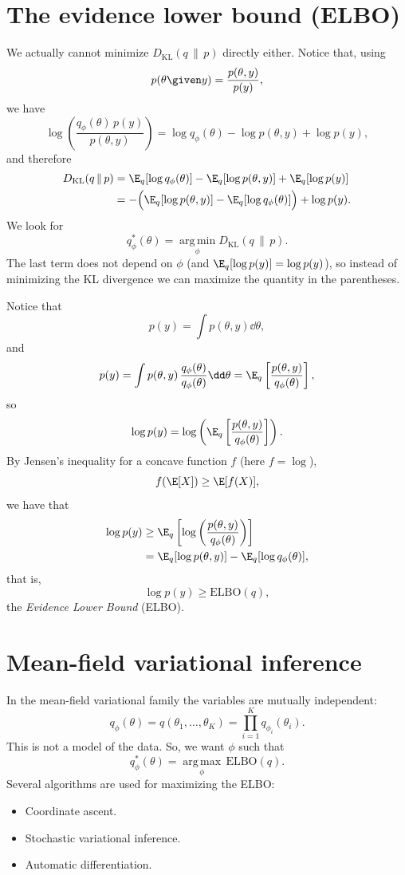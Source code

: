 \section{The evidence lower bound (ELBO)}
We actually cannot minimize $D_{\mathrm{KL}}(q \,\|\, p)$ directly either. Notice that, using
\[
p(\theta \given y) = \frac{p(\theta, y)}{p(y)},
\]
we have
\[
\log\left(\frac{q_\phi(\theta)\,p(y)}{p(\theta, y)}\right) = \log q_\phi(\theta) - \log p(\theta, y) + \log p(y),
\]
and therefore
\begin{align*}
D_{\mathrm{KL}}(q \,\|\, p) &= \E_q[\log q_\phi(\theta)] - \E_q[\log p(\theta, y)] + \E_q[\log p(y)] \\
&= -\Bigl(\E_q[\log p(\theta, y)] - \E_q[\log q_\phi(\theta)]\Bigr) + \log p(y).
\end{align*}
We look for
\[
q^*_\phi(\theta) = \operatorname*{arg\,min}_\phi D_{\mathrm{KL}}(q \,\|\, p).
\]
The last term does not depend on $\phi$ (and $\E_q[\log p(y)] = \log p(y)$), so instead of minimizing the KL divergence we can maximize the quantity in the parentheses.

Notice that
\[
p(y) = \int p(\theta, y)\dd\theta,
\]
and
\[
p(y) = \int p(\theta, y)\,\frac{q_\phi(\theta)}{q_\phi(\theta)}\dd\theta = \E_q\left[\frac{p(\theta, y)}{q_\phi(\theta)}\right],
\]
so
\[
\log p(y) = \log\left(\E_q\left[\frac{p(\theta, y)}{q_\phi(\theta)}\right]\right).
\]
By Jensen's inequality for a concave function $f$ (here $f = \log$),
\[
f(\E[X]) \ge \E[f(X)],
\]
we have that
\begin{align*}
\log p(y) &\ge \E_q\left[\log\left(\frac{p(\theta, y)}{q_\phi(\theta)}\right)\right] \\
&= \E_q[\log p(\theta, y)] - \E_q[\log q_\phi(\theta)],
\end{align*}
that is,
\[
\boxed{\log p(y) \ge \mathrm{ELBO}(q)},
\]
the \emph{Evidence Lower Bound} (ELBO).

\section{Mean-field variational inference}
In the mean-field variational family the variables are mutually independent:
\[
q_\phi(\theta) = q(\theta_1, \dots, \theta_K) = \prod_{i=1}^{K} q_{\phi_i}(\theta_i).
\]
This is not a model of the data. So, we want $\phi$ such that
\[
q^*_\phi(\theta) = \operatorname*{arg\,max}_\phi\, \mathrm{ELBO}(q).
\]
Several algorithms are used for maximizing the ELBO:
\begin{itemize}
  \item Coordinate ascent.
  \item Stochastic variational inference.
  \item Automatic differentiation.
\end{itemize}

